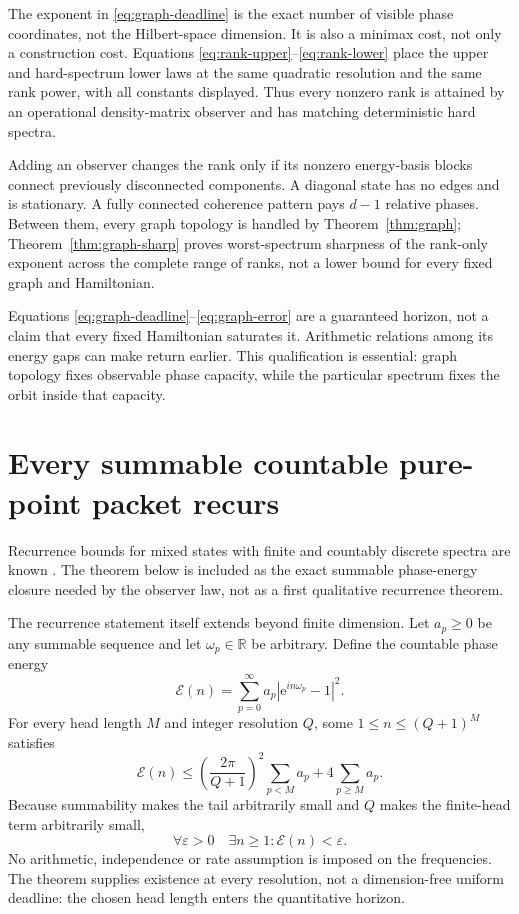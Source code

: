 \documentclass[10pt]{article}
\theoremstyle{definition}
\newcommand{\R}{\mathbb R}
\newcommand{\ee}{\mathrm e}
\begin{document}
The exponent in \eqref{eq:graph-deadline} is the exact number of visible phase
coordinates, not the Hilbert-space dimension.  It is also a minimax cost, not
only a construction cost.  Equations
\eqref{eq:rank-upper}--\eqref{eq:rank-lower} place the upper and hard-spectrum
lower laws at the same quadratic resolution and the same rank power, with
all constants displayed.  Thus every nonzero rank is attained by an
operational density-matrix observer and has matching deterministic hard
spectra.

Adding an observer changes the rank only if its nonzero energy-basis blocks
connect previously disconnected components.  A diagonal state has no edges
and is stationary.  A fully connected coherence pattern pays \(d-1\)
relative phases.  Between them, every graph topology is handled by
Theorem~\ref{thm:graph}; Theorem~\ref{thm:graph-sharp} proves worst-spectrum
sharpness of the rank-only exponent across the complete range of ranks, not a
lower bound for every fixed graph and Hamiltonian.

Equations \eqref{eq:graph-deadline}--\eqref{eq:graph-error} are a guaranteed
horizon, not a claim that every fixed Hamiltonian saturates it.  Arithmetic
relations among its energy gaps can make return earlier.  This qualification
is essential: graph topology fixes observable phase capacity, while the
particular spectrum fixes the orbit inside that capacity.

\section*{Every summable countable pure-point packet recurs}

Recurrence bounds for mixed states with finite and countably discrete spectra
are known \cite{GimenoSotoca2017}.  The theorem below is included as the exact
summable phase-energy closure needed by the observer law, not as a first
qualitative recurrence theorem.

The recurrence statement itself extends beyond finite dimension.  Let
\(a_p\geq0\) be any summable sequence and let \(\omega_p\in\R\) be arbitrary.
Define the countable phase energy
\begin{equation}
 \mathcal E(n)=\sum_{p=0}^{\infty}a_p
   \left|\ee^{in\omega_p}-1\right|^2.
\label{eq:countable-energy}
\end{equation}
For every head length \(M\) and integer resolution \(Q\), some
\(1\leq n\leq(Q+1)^M\) satisfies
\begin{equation}
 \mathcal E(n)\leq
 \left(\frac{2\pi}{Q+1}\right)^2\sum_{p<M}a_p
 +4\sum_{p\geq M}a_p.
\label{eq:head-tail}
\end{equation}
Because summability makes the tail arbitrarily small and \(Q\) makes the
finite-head term arbitrarily small,
\begin{equation}
 \boxed{\quad
 \forall\varepsilon>0\quad\exists n\geq1:
 \mathcal E(n)<\varepsilon.\quad}
\label{eq:countable-recurrence}
\end{equation}
No arithmetic, independence or rate assumption is imposed on the
frequencies.  The theorem supplies existence at every resolution, not a
dimension-free uniform deadline: the chosen head length enters the
quantitative horizon.
\end{document}
